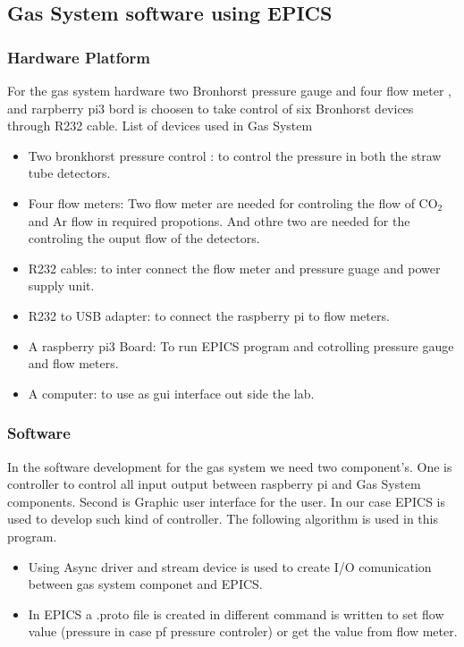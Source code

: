 \subsection{Gas System software using EPICS}
\subsubsection{Hardware Platform}
For the gas system hardware two Bronhorst pressure gauge and four flow meter , and rarpberry pi3 bord is choosen to take control of six Bronhorst devices through R232 cable.
List of devices used in Gas System
\begin{itemize}
    \item Two bronkhorst pressure control : to control the pressure in both the straw tube detectors.
    \item Four flow meters: Two flow meter are needed for controling the flow of CO$_{2}$  and Ar flow in required propotions. And othre two are needed for the controling the ouput flow of the detectors.
    \item R232 cables: to inter connect the flow meter and pressure guage and power supply unit.
    \item R232 to USB adapter: to connect the raspberry pi to flow meters.
    \item A raspberry pi3 Board: To run EPICS program and cotrolling pressure gauge and flow meters.
    \item A computer: to use as gui interface out side the lab.
    \end{itemize}

\subsubsection{Software}
In the software development for the gas system we need two component's. One is controller to control all input output between raspberry pi and Gas System components. Second is Graphic user interface for the user.
In our case EPICS is used to develop such kind of controller. The following algorithm is used in this program.
\begin{itemize}
    \item Using Async driver and stream device is used to create I/O comunication between gas system componet and EPICS.
    \item In EPICS a .proto file is created in different command is written to set flow value (pressure in case pf pressure controler) or get the value from flow meter.
\end{itemize}



